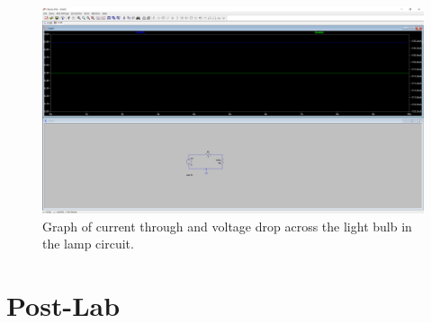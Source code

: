 \documentclass[10pt]{article}
\begin{document}
\begin{figure}[H]
	\centering
		\includegraphics[width=5in]{Capture10}
	\caption{Graph of current through and voltage drop across the light bulb in the lamp circuit.}
\end{figure}

\section*{Post-Lab}
\end{document}
